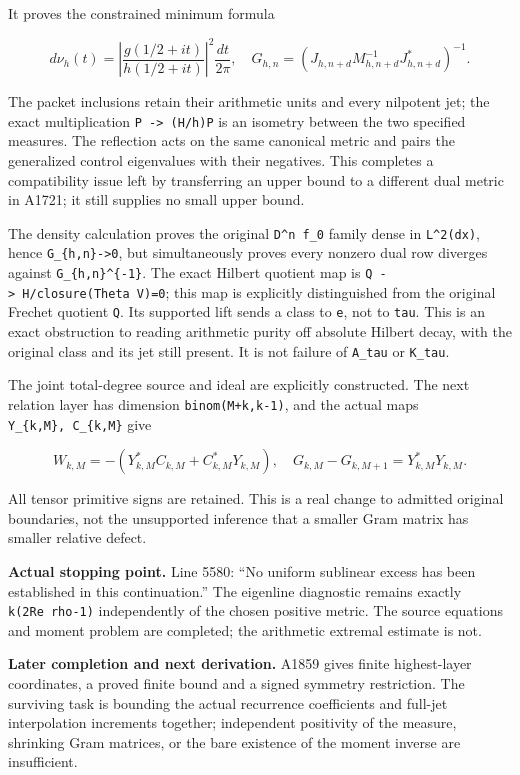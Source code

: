 It proves the constrained minimum formula

\[
d\nu_h(t)=\left|\frac{g(1/2+it)}{h(1/2+it)}\right|^2\frac{dt}{2\pi},\quad
G_{h,n}=(J_{h,n+d}M_{h,n+d}^{-1}J_{h,n+d}^*)^{-1}.
\]

The packet inclusions retain their arithmetic units and every nilpotent
jet; the exact multiplication \texttt{P\ -\textgreater{}\ (H/h)P} is an
isometry between the two specified measures. The reflection acts on the
same canonical metric and pairs the generalized control eigenvalues with
their negatives. This completes a compatibility issue left by
transferring an upper bound to a different dual metric in A1721; it
still supplies no small upper bound.

The density calculation proves the original \texttt{D\^{}n\ f\_0} family
dense in \texttt{L\^{}2(dx)}, hence \texttt{G\_\{h,n\}-\textgreater{}0},
but simultaneously proves every nonzero dual row diverges against
\texttt{G\_\{h,n\}\^{}\{-1\}}. The exact Hilbert quotient map is
\texttt{Q\ -\textgreater{}\ H/closure(Theta\ V)=0}; this map is
explicitly distinguished from the original Frechet quotient \texttt{Q}.
Its supported lift sends a class to \texttt{e}, not to \texttt{tau}.
This is an exact obstruction to reading arithmetic purity off absolute
Hilbert decay, with the original class and its jet still present. It is
not failure of \texttt{A\_tau} or \texttt{K\_tau}.

The joint total-degree source and ideal are explicitly constructed. The
next relation layer has dimension \texttt{binom(M+k,k-1)}, and the
actual maps \texttt{Y\_\{k,M\},\ C\_\{k,M\}} give

\[
W_{k,M}=-(Y_{k,M}^*C_{k,M}+C_{k,M}^*Y_{k,M}),\quad
G_{k,M}-G_{k,M+1}=Y_{k,M}^*Y_{k,M}.
\]

All tensor primitive signs are retained. This is a real change to
admitted original boundaries, not the unsupported inference that a
smaller Gram matrix has smaller relative defect.

\textbf{Actual stopping point.} Line 5580: ``No uniform sublinear excess
has been established in this continuation.'' The eigenline diagnostic
remains exactly \texttt{k(2Re\ rho-1)} independently of the chosen
positive metric. The source equations and moment problem are completed;
the arithmetic extremal estimate is not.

\textbf{Later completion and next derivation.} A1859 gives finite
highest-layer coordinates, a proved finite bound and a signed symmetry
restriction. The surviving task is bounding the actual recurrence
coefficients and full-jet interpolation increments together; independent
positivity of the measure, shrinking Gram matrices, or the bare
existence of the moment inverse are insufficient.

